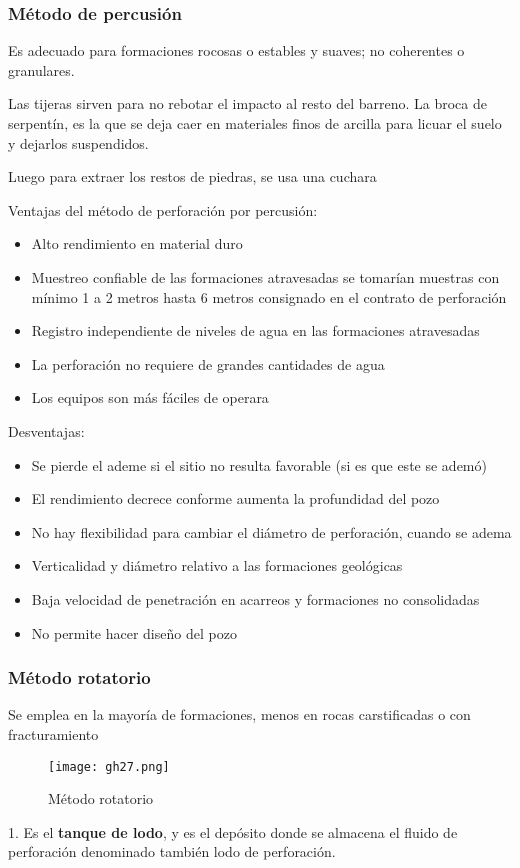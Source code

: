 \subsubsection{Método de percusión}
Es adecuado para formaciones rocosas o estables y suaves; no coherentes o granulares.

Las tijeras sirven para no rebotar el impacto al resto del barreno.
La broca de serpentín, es la que se deja caer en materiales finos de arcilla para licuar el suelo y dejarlos suspendidos.

Luego para extraer los restos de piedras, se usa una cuchara 



Ventajas del método de perforación por percusión:
\begin{itemize}
    \item Alto rendimiento en material duro
    \item Muestreo confiable de las formaciones atravesadas se tomarían muestras con mínimo 1 a 2 metros hasta 6 metros consignado en el contrato de perforación
    \item Registro independiente de niveles de agua en las formaciones atravesadas
    \item La perforación no requiere de grandes cantidades de agua
    \item Los equipos son más fáciles de operara 
\end{itemize}
Desventajas:
\begin{itemize}
    \item Se pierde el ademe si el sitio no resulta favorable (si es que este se ademó)
    \item El rendimiento decrece conforme aumenta la profundidad del pozo
    \item No hay flexibilidad para cambiar el diámetro de perforación, cuando se adema
    \item Verticalidad y diámetro relativo a las formaciones geológicas
    \item Baja velocidad de penetración en acarreos y formaciones no consolidadas
    \item No permite hacer diseño del pozo
\end{itemize}
\subsubsection{Método rotatorio}
Se emplea en la mayoría de formaciones, menos en rocas carstificadas o con fracturamiento
\begin{figure}[h!]
\centering
  \texttt{[image: gh27.png]}
  \caption{Método rotatorio}
  \label{gh27}
\end{figure}
1. Es el \textbf{tanque de lodo}, y es el depósito donde se almacena el fluido de perforación denominado también lodo de perforación.

